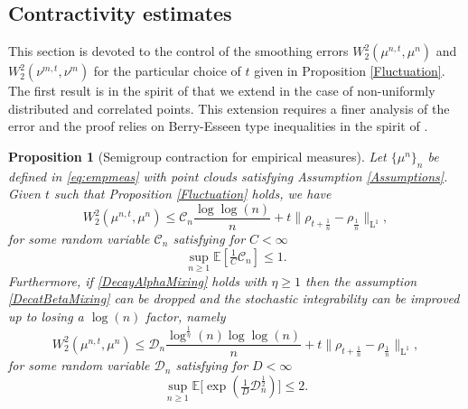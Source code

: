 \documentclass[11pt,a4paper,oneside]{amsart}
\numberwithin{equation}{section}
\newtheorem{proposition}[theorem]{Proposition}
\newcommand{\LL}{\mathrm{L}}
\begin{document}
\subsection{Contractivity estimates}
%
This section is devoted to the control of the smoothing errors $W^2_2(\mu^{n,t},\mu^{n})$ and $W^2_2(\nu^{m,t},\nu^{m})$ for the particular choice of $t$ given in Proposition \ref{Fluctuation}. The first result is in the spirit of \cite[Theorem 5.2]{ambrosio2019finer} that we extend in the case of non-uniformly distributed and correlated points. This extension requires a finer analysis of the error and the proof relies on Berry-Esseen type inequalities in the spirit of \cite[Theorem 5]{borda2021empirical}.
%
\begin{proposition}[Semigroup contraction for empirical measures]\label{Contractivity}
Let $\{\mu^n\}_n$ be defined in \eqref{eq:empmeas} with point clouds satisfying Assumption \ref{Assumptions}. Given $t$ such that Proposition \ref{Fluctuation} holds, we have
%
\begin{equation}\label{ContractivityEstiExpectation}
%
W_2^2(\mu^{n,t}, \mu^{n}) \le \mathcal{C}_n \frac{\log\log(n)}{n}+t\big\|\rho_{t+\frac{1}{n}}-\rho_{\frac{1}{n}}\big\|_{\LL^1},
%
\end{equation}
%
for some random variable $\mathcal{C}_n$ satisfying for $C<\infty$
%
$$\sup_{n \ge 1} \mathbb{E} [\tfrac1{C}\mathcal{C}_n]\leq 1.$$
%
Furthermore, if \eqref{DecayAlphaMixing} holds with $\eta\geq 1$ then the assumption \eqref{DecatBetaMixing} can be dropped and the stochastic integrability can be improved up to losing a $\log(n)$ factor, namely
%
\begin{equation}\label{ContractivityEstiExpMoment}
%
W_2^2(\mu^{n,t}, \mu^{n}) \le \mathcal{D}_n \frac{\log^{\frac{1}{\eta}}(n)\log\log(n)}{n}+t\big\|\rho_{t+\frac{1}{n}}-\rho_{\frac{1}{n}}\big\|_{\LL^1},
%
\end{equation}
%
for some random variable $\mathcal{D}_n$ satisfying for $D<\infty$
%
$$\sup_{n \ge 1} \mathbb{E} \big[\exp(\tfrac1{D}\mathcal{D}^{\frac{1}{2}}_n)\big]\leq 2.$$
%
\end{proposition}
\end{document}
